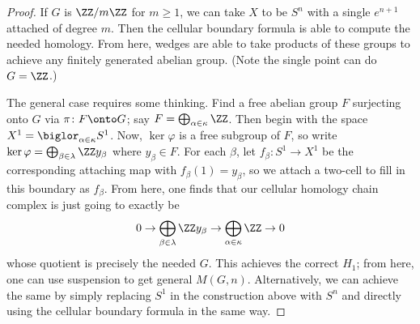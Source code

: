 \documentclass[../notes.tex]{subfiles}
\begin{document}
\begin{proof}
	If $G$ is $\ZZ/m\ZZ$ for $m\ge1$, we can take $X$ to be $S^n$ with a single $e^{n+1}$ attached of degree $m$. Then the cellular boundary formula is able to compute the needed homology. From here, wedges are able to take products of these groups to achieve any finitely generated abelian group. (Note the single point can do $G=\ZZ$.)

	The general case requires some thinking. Find a free abelian group $F$ surjecting onto $G$ via $\pi\colon F\onto G$; say $F=\bigoplus_{\alpha\in\kappa}\ZZ$. Then begin with the space $X^1=\biglor_{\alpha\in\kappa}S^1$. Now, $\ker\varphi$ is a free subgroup of $F$, so write $\ker\varphi=\bigoplus_{\beta\in\lambda}\ZZ y_\beta$ where $y_\beta\in F$. For each $\beta$, let $f_\beta\colon S^1\to X^1$ be the corresponding attaching map with $f_\beta(1)=y_\beta$, so we attach a two-cell to fill in this boundary as $f_\beta$. From here, one finds that our cellular homology chain complex is just going to exactly be
	\[0\to\bigoplus_{\beta\in\lambda}\ZZ y_\beta\to\bigoplus_{\alpha\in\kappa}\ZZ\to0\]
	whose quotient is precisely the needed $G$. This achieves the correct $H_1$; from here, one can use suspension to get general $M(G,n)$. Alternatively, we can achieve the same by simply replacing $S^1$ in the construction above with $S^n$ and directly using the cellular boundary formula in the same way.
\end{proof}
\end{document}
